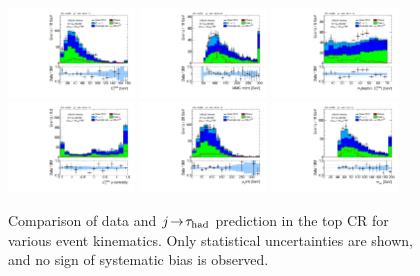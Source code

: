\begin{figure}[!htpb]
  \includegraphics[width=0.30\textwidth]{figures/analysis/vbf-topCR/met-pt-hi}
  \includegraphics[width=0.30\textwidth]{figures/analysis/vbf-topCR/mMMC}
  \includegraphics[width=0.30\textwidth]{figures/analysis/vbf-topCR/mT} \\
  \includegraphics[width=0.30\textwidth]{figures/analysis/vbf-topCR/met-phi-centrality}
  \includegraphics[width=0.30\textwidth]{figures/analysis/vbf-topCR/H-pt-hi}
  \includegraphics[width=0.30\textwidth]{figures/analysis/vbf-topCR/mvis} \\
  \caption{Comparison of data and $j\!\rightarrow\!\tau_\text{had}$ prediction in the top CR for various event kinematics. Only statistical uncertainties are shown, and no sign of systematic bias is observed.}
  \label{fig:backgrounds-topCR-taus}
\end{figure}

